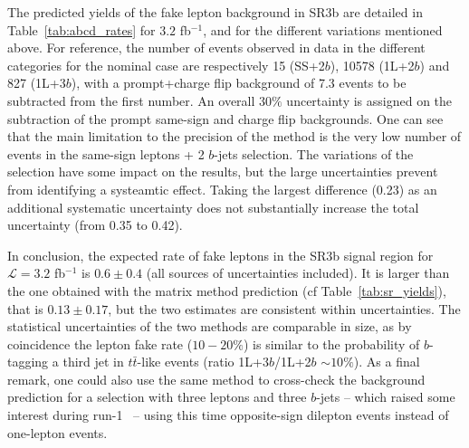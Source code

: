 The predicted yields of the fake lepton background in SR3b are detailed in Table~\ref{tab:abcd_rates} for $3.2$ fb$^{-1}$, 
and for the different variations mentioned above. 
For reference, the number of events observed in data in the different categories for the nominal case are respectively 15 (SS+2$b$), 10578 (1L+2$b$) and 827 (1L+3$b$), 
with a prompt+charge flip background of 7.3 events to be subtracted from the first number. 
An overall $30\%$ uncertainty is assigned on the subtraction of the prompt same-sign and charge flip backgrounds. 
One can see that the main limitation to the precision of the method is the very low number of events in the same-sign leptons + 2 $b$-jets selection. 
The variations of the selection have some impact on the results, but the large uncertainties prevent from identifying a systeamtic effect. 
Taking the largest difference (0.23) as an additional systematic uncertainty does not substantially increase the total uncertainty (from 0.35 to 0.42). 

In conclusion, the expected rate of fake leptons in the SR3b signal region for $\mathcal L=3.2$ fb$^{-1}$ is $0.6\pm 0.4$ 
(all sources of uncertainties included). 
It is larger than the one obtained with the matrix method prediction (cf Table~\ref{tab:sr_yields}), that is $0.13\pm 0.17$, 
but the two estimates are consistent within uncertainties. 
The statistical uncertainties of the two methods are comparable in size, as by coincidence the lepton fake rate ($10-20\%$) 
is similar to the probability of $b$-tagging a third jet in $t\bar t$-like events (ratio 1L+3$b$/1L+2$b$ $\sim 10\%$). 
As a final remark, one could also use the same method to cross-check the background prediction for a selection with three leptons and three $b$-jets -- 
which raised some interest during run-1~\cite{3l3b} -- using this time opposite-sign dilepton events instead of one-lepton events. 